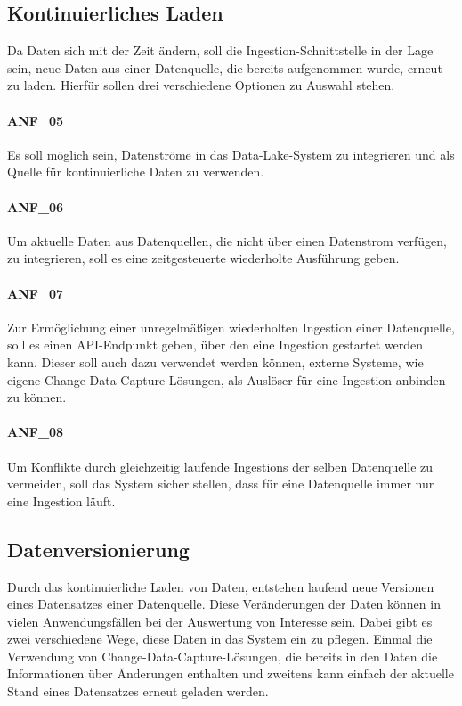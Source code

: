 \subsection{Kontinuierliches Laden}
Da Daten sich mit der Zeit ändern, soll die Ingestion-Schnittstelle in der Lage sein, neue Daten aus einer Datenquelle, die bereits aufgenommen wurde, erneut zu laden.
Hierfür sollen drei verschiedene Optionen zu Auswahl stehen.

\paragraph{ANF\_05}
\label{ANF_05}
Es soll möglich sein, Datenströme in das Data-Lake-System zu integrieren und als Quelle für kontinuierliche Daten zu verwenden.

\paragraph{ANF\_06}
\label{ANF_06}
Um aktuelle Daten aus Datenquellen, die nicht über einen Datenstrom verfügen, zu integrieren, soll es eine zeitgesteuerte wiederholte Ausführung geben.

\paragraph{ANF\_07}
\label{ANF_07}
Zur Ermöglichung einer unregelmäßigen wiederholten Ingestion einer Datenquelle, soll es einen API-Endpunkt geben, über den eine Ingestion gestartet werden kann.
Dieser soll auch dazu verwendet werden können, externe Systeme, wie eigene Change-Data-Capture-Lösungen, als Auslöser für eine Ingestion anbinden zu können.

\paragraph{ANF\_08}
\label{ANF_08}
Um Konflikte durch gleichzeitig laufende Ingestions der selben Datenquelle zu vermeiden, soll das System sicher stellen, dass für eine Datenquelle immer nur eine Ingestion läuft.

\subsection{Datenversionierung}
Durch das kontinuierliche Laden von Daten, entstehen laufend neue Versionen eines Datensatzes einer Datenquelle.
Diese Veränderungen der Daten können in vielen Anwendungsfällen bei der Auswertung von Interesse sein.
Dabei gibt es zwei verschiedene Wege, diese Daten in das System ein zu pflegen.
Einmal die Verwendung von Change-Data-Capture-Lösungen, die bereits in den Daten die Informationen über Änderungen enthalten und zweitens kann einfach der aktuelle Stand eines Datensatzes erneut geladen werden.

